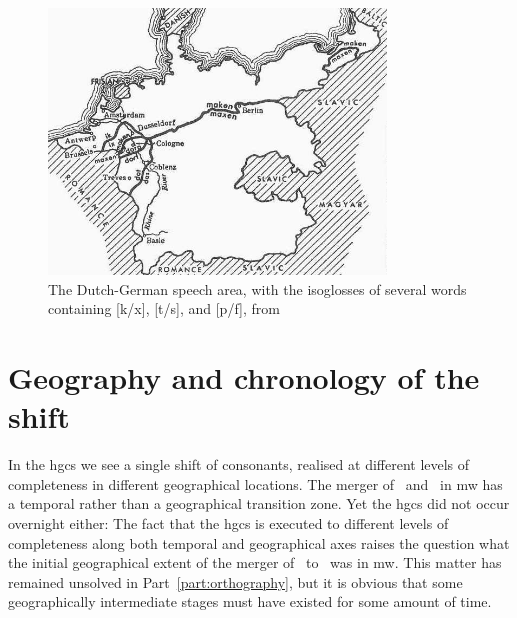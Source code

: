 \begin{figure}[h]
  \centering
  \includegraphics[width=0.8\textwidth]{3orth/images/hgcs.jpg}
  \caption[Bloomfield's isoglosses of the \acrshort{hgcs}.]{The Dutch-German speech area, with the isoglosses of several words containing [k/x], [t/s], and [p/f], from \textcite[344]{Blo_Language33}}
\label{fig:hgcsmap}
\end{figure}

\section{Geography and chronology of the shift}
\label{sec:geogr-chron-shift}

In the \gls{hgcs} we see a single shift of consonants, realised at different levels of completeness in different geographical locations. The merger of \lT\ and \xD\ in \gls{mw} has a temporal rather than a geographical transition zone. Yet the \gls{hgcs} did not occur overnight either:
The fact that the \gls{hgcs} is executed to different levels of completeness along both temporal and geographical axes raises the question what the initial geographical extent of the merger of \lT\ to \xD\ was in \gls{mw}. This matter has remained unsolved in Part~\ref{part:orthography}, but it is obvious that some geographically intermediate stages must have existed for some amount of time.


